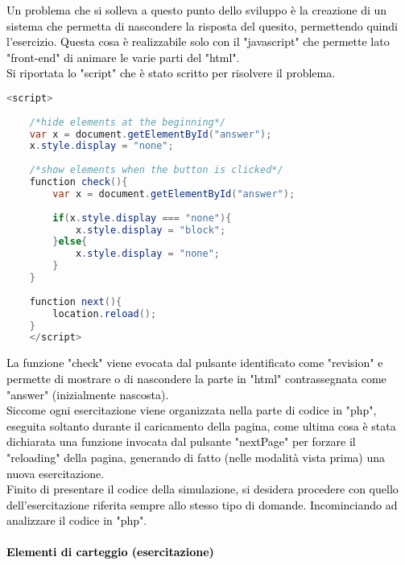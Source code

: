 \textcolor{black}{Un problema che si solleva a questo punto dello sviluppo è la creazione di un sistema che permetta di nascondere la risposta del quesito, permettendo quindi l'esercizio. Questa cosa è realizzabile solo con il "javascript" che permette lato "front-end" di animare le varie parti del "html".\\
Si riportata lo "script" che è stato scritto per risolvere il problema.}\\

\begin{lstlisting}[language=java]
	<script>
	
	/*hide elements at the beginning*/
	var x = document.getElementById("answer");
	x.style.display = "none";
	
	/*show elements when the button is clicked*/
	function check(){
		var x = document.getElementById("answer");
		
		if(x.style.display === "none"){
			x.style.display = "block";
		}else{
			x.style.display = "none";
		}	
	}
	
	function next(){
		location.reload();  
	}
	</script>
\end{lstlisting}

\textcolor{black}{La funzione "check" viene evocata dal pulsante identificato come "revision" e permette di mostrare o di nascondere la parte in "html" contrassegnata come "answer" (inizialmente nascosta).\\
Siccome ogni esercitazione viene organizzata nella parte di codice in "php", eseguita soltanto durante il caricamento della pagina, come ultima cosa è stata dichiarata una funzione invocata dal pulsante "nextPage" per forzare il "reloading" della pagina, generando di fatto (nelle modalità vista prima) una nuova esercitazione.}\\
\bigskip
\textcolor{black}{Finito di presentare il codice della simulazione, si desidera procedere con quello dell'esercitazione riferita sempre allo stesso tipo di domande. Incominciando ad analizzare il codice in "php"}.

\paragraph{\textcolor{black}{Elementi di carteggio (esercitazione)}}\leavevmode\\

